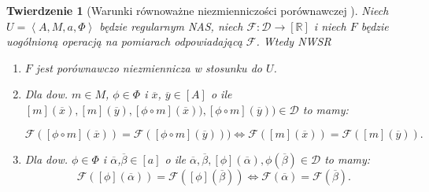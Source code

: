 \documentclass[12pt,a4paper]{report}
\newtheorem{tw}[definition]{Twierdzenie}
\newcommand{\domkniecie}[1]{\left[ {#1} \right] }
\newcommand{\tuple}[1]{\left\langle {#1} \right\rangle}
\begin{document}
\begin{tw}[Warunki równoważne niezmienniczości porównawczej {\citep[Tw. 1]{adams1965theory}}]
Niech $U=\tuple{A,M,a,\Phi}$ będzie regularnym NAS, niech $\mathcal{F}:\mathcal{D}\to \domkniecie{\mathbb{R}}$ i niech $F$ będzie uogólnioną operacją na pomiarach odpowiadającą $\mathcal{F}$. Wtedy
NWSR
\begin{enumerate}
\item
$F$ jest porównawczo niezmiennicza w stosunku do $U$.
\item
Dla dow. $m \in M$, $\phi \in \Phi$ i $\overline{x}$, $\overline{y} \in \domkniecie{A}$ o ile $\domkniecie{m}(\overline{x}), \domkniecie{
m}(\overline{y}), \domkniecie{\phi\circ m}(\overline{x})), \domkniecie{\phi\circ m}(\overline{y})) \in \mathcal{D}$ to mamy:

$$
\mathcal{F}(\domkniecie{\phi \circ m}(\overline{x}))=\mathcal{F}(\domkniecie{\phi \circ m}(\overline{y}))) \iff \mathcal{F}(\domkniecie{m}(\overline{x}))=\mathcal{F}(\domkniecie{m}(\overline{y})).
$$
\item
Dla dow. $\phi \in \Phi$ i $\overline{\alpha}$,$ \overline{\beta} \in \domkniecie{a}$ o ile $\overline{\alpha}, \overline{\beta}, \domkniecie{\phi}(\overline{\alpha}), \phi(\overline{\beta}) \in \mathcal{D}$ to mamy:
\begin{equation*}
\mathcal{F}(\domkniecie{\phi}(\overline{\alpha}))=\mathcal{F}(\domkniecie{\phi}(\overline{\beta})) \iff \mathcal{F}(\overline{\alpha})=\mathcal{F}(\overline{\beta}).
\end{equation*}
\end{enumerate}

\end{tw}
\end{document}
